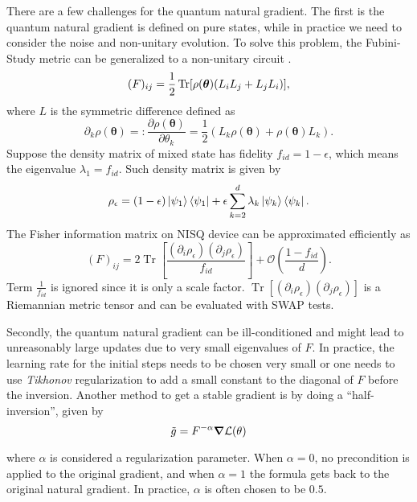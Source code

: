 There are a few challenges for the quantum natural gradient. The first is the quantum natural gradient is defined on pure states, while in practice we need to consider the noise and non-unitary evolution. To solve this problem, the Fubini-Study metric can be generalized to a non-unitary circuit \cite{koczor_quantum_2020}.
\begin{equation} 
	(F)_{ij} = \frac{1}{2} \Tr[\rho(\boldsymbol{\theta})   (L_i L_j + L_j L_i) ],
\end{equation}
where $L$ is the symmetric difference defined as 
\begin{equation} 
	\partial_k \rho(\boldsymbol{\theta})  =: \frac{\partial \rho(\boldsymbol{\theta})}{\partial \theta_k} =  \frac{1}{2}(L_k \rho(\boldsymbol{\theta}) +\rho(\boldsymbol{\theta}) L_k).
\end{equation}
Suppose the density matrix of mixed state has fidelity $f_{id} = 1-\epsilon$, which means the eigenvalue $\lambda_1 = f_{id}$. Such density matrix is given by
\begin{equation}
    \rho_\epsilon = (1-\epsilon)\ket{\psi_1}{\bra{\psi_1}} + \epsilon \sum_{k=2}^d \lambda_k \ket{\psi_k}\bra{\psi_k}.
\end{equation}
The Fisher information matrix on NISQ device can be approximated efficiently as
\begin{equation}
    (F)_{ij} = 2\operatorname{Tr}[\frac{(\partial_i\rho_\epsilon)(\partial_j\rho_\epsilon)}{f_{id}}] + \mathcal{O}(\frac{1-f_{id}}{d}).
\end{equation}
Term $\frac{1}{f_{id}}$ is ignored since it is only a scale factor. $\operatorname{Tr}[(\partial_i\rho_\epsilon)(\partial_j\rho_\epsilon)]$ is a Riemannian metric tensor and can be evaluated with SWAP tests.

Secondly, the quantum natural gradient can be ill-conditioned and might lead to unreasonably large updates due to very small eigenvalues of $F$. In practice, the learning rate for the initial steps needs to be chosen very small or one needs to use \textit{Tikhonov} regularization to add a small constant to the diagonal of $F$ before the inversion. Another method to get a stable gradient is by doing a “half-inversion”, given by \cite{haug_optimal_2021}
\begin{equation}
    \Tilde{g} =F^{-\alpha} \grad \mathcal{L}(\theta)
\end{equation}

where $\alpha$ is considered a regularization parameter. When $\alpha=0$, no precondition is applied to the original gradient, and when $\alpha=1$ the formula gets back to the original natural gradient. In practice, $\alpha$ is often chosen to be $0.5$. 

